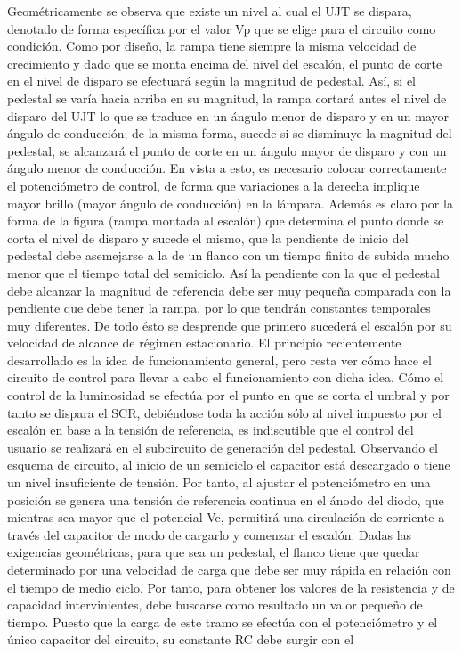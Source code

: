 \documentclass{article}
\begin{document}
Geométricamente se observa que existe un nivel al cual el UJT se dispara, denotado de               forma específica por el valor Vp que se elige para el circuito como condición. Como por diseño,                 la rampa tiene siempre la misma velocidad de crecimiento y dado que se monta encima del                nivel del escalón, el punto de corte en el nivel de disparo se efectuará según la magnitud de pedestal. Así, si el pedestal se varía hacia arriba en su magnitud, la rampa cortará antes el                 nivel de disparo del UJT lo que se traduce en un ángulo menor de disparo y en un mayor                   ángulo de conducción; de la misma forma, sucede si se disminuye la magnitud del pedestal, se                alcanzará el punto de corte en un ángulo mayor de disparo y con un ángulo menor de                 conducción. En vista a esto, es necesario colocar correctamente el potenciómetro de control,             de forma que variaciones a la derecha implique mayor brillo (mayor ángulo de conducción) en               la lámpara. Además es claro por la forma de la figura (rampa montada al escalón) que determina el                punto donde se corta el nivel de disparo y sucede el mismo, que la pendiente de inicio del                  pedestal debe asemejarse a la de un flanco con un tiempo finito de subida mucho menor que el                  tiempo total del semiciclo. Así la pendiente con la que el pedestal debe alcanzar la magnitud de                 referencia debe ser muy pequeña comparada con la pendiente que debe tener la rampa, por lo                que tendrán constantes temporales muy diferentes. De todo ésto se desprende que primero             sucederá el escalón por su velocidad de alcance de régimen estacionario. El principio recientemente desarrollado es la idea de funcionamiento general, pero resta ver             cómo hace el circuito de control para llevar a cabo el funcionamiento con dicha idea.  Cómo el control de la luminosidad se efectúa por el punto en que se corta el umbral y por                   tanto se dispara el SCR, debiéndose toda la acción sólo al nivel impuesto por el escalón en                 base a la tensión de referencia, es indiscutible que el control del usuario se realizará en el                 subcircuito de generación del pedestal. Observando el esquema de circuito, al inicio de un semiciclo el capacitor está descargado o               tiene un nivel insuficiente de tensión. Por tanto, al ajustar el potenciómetro en una posición se                genera una tensión de referencia continua en el ánodo del diodo, que mientras sea mayor que                el potencial Ve, permitirá una circulación de corriente a través del capacitor de modo de               cargarlo y comenzar el escalón. Dadas las exigencias geométricas, para que sea un pedestal,              el flanco tiene que quedar determinado por una velocidad de carga que debe ser muy rápida en                 relación con el tiempo de medio ciclo. Por tanto, para obtener los valores de la resistencia y de                  capacidad intervinientes, debe buscarse como resultado un valor pequeño de tiempo. Puesto            que la carga de este tramo se efectúa con el potenciómetro y el único capacitor del circuito, su                  constante RC debe surgir con el 
\end{document}
